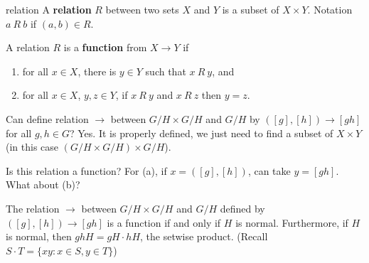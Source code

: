 \begin{defn}{relation}
A \textbf{relation} $R$ between two sets $X$ and $Y$ is a subset of $X\times Y$. Notation $a~R~b$ if $(a,b)\in R$.

A relation $R$ is a \textbf{function} from $X\to Y$ if 
\begin{enumerate}[label=(\alph*)]
\item for all $x\in X$, there is $y\in Y$ such that $x ~R~ y$, and 
\item for all $x\in X$, $y,z\in Y$, if $x ~R~ y$ and $x ~R~ z$ then $y=z$.
\end{enumerate}
\end{defn}

Can define relation $\to$ between $G/H\times G/H$ and $G/H$ by $([g],[h])\to [gh]$ for all $g,h\in G$? Yes. It is properly defined, we just need to find a subset of $X\times Y$ (in this case $(G/H\times G/H)\times G/H$).

Is this relation a function? For (a), if $x=([g],[h])$, can take $y=[gh]$. What about (b)?

\begin{lemma}
The relation $\to$ between $G/H\times G/H$ and $G/H$ defined by $([g],[h])\to [gh]$ is a function if and only if  $H$ is normal.
Furthermore, if $H$ is normal, then $ghH = gH\cdot hH$, the setwise product. (Recall $S\cdot T=\{xy:x\in S,y\in T\}$)
\end{lemma}

\begin{pf}

\end{pf}
\printindex


